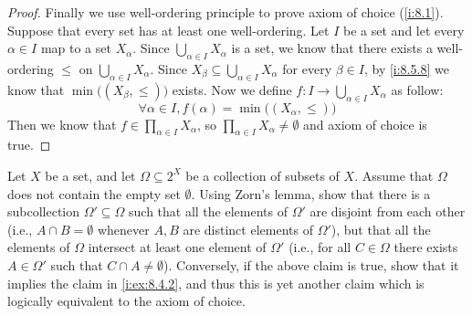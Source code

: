 \begin{proof}
  Finally we use well-ordering principle to prove axiom of choice (\cref{i:8.1}).
  Suppose that every set has at least one well-ordering.
  Let \(I\) be a set and let every \(\alpha \in I\) map to a set \(X_{\alpha}\).
  Since \(\bigcup_{\alpha \in I} X_{\alpha}\) is a set, we know that there exists a well-ordering \(\leq\) on \(\bigcup_{\alpha \in I} X_{\alpha}\).
  Since \(X_{\beta} \subseteq \bigcup_{\alpha \in I} X_{\alpha}\) for every \(\beta \in I\), by \cref{i:8.5.8} we know that \(\min\big((X_{\beta}, \leq)\big)\) exists.
  Now we define \(f : I \to \bigcup_{\alpha \in I} X_{\alpha}\) as follow:
  \[
    \forall \alpha \in I, f(\alpha) = \min\big((X_{\alpha}, \leq)\big)
  \]
  Then we know that \(f \in \prod_{\alpha \in I} X_{\alpha}\), so \(\prod_{\alpha \in I} X_{\alpha} \neq \emptyset\) and axiom of choice is true.
\end{proof}

\begin{ex}\label{i:ex:8.5.20}
  Let \(X\) be a set, and let \(\Omega \subseteq 2^X\) be a collection of subsets of \(X\).
  Assume that \(\Omega\) does not contain the empty set \(\emptyset\).
  Using Zorn's lemma, show that there is a subcollection \(\Omega' \subseteq \Omega\) such that all the elements of \(\Omega'\) are disjoint from each other (i.e., \(A \cap B = \emptyset\) whenever \(A, B\) are distinct elements of \(\Omega'\)), but that all the elements of \(\Omega\) intersect at least one element of \(\Omega'\) (i.e., for all \(C \in \Omega\) there exists \(A \in \Omega'\) such that \(C \cap A \neq \emptyset\)).
  Conversely, if the above claim is true, show that it implies the claim in \cref{i:ex:8.4.2}, and thus this is yet another claim which is logically equivalent to the axiom of choice.
\end{ex}

